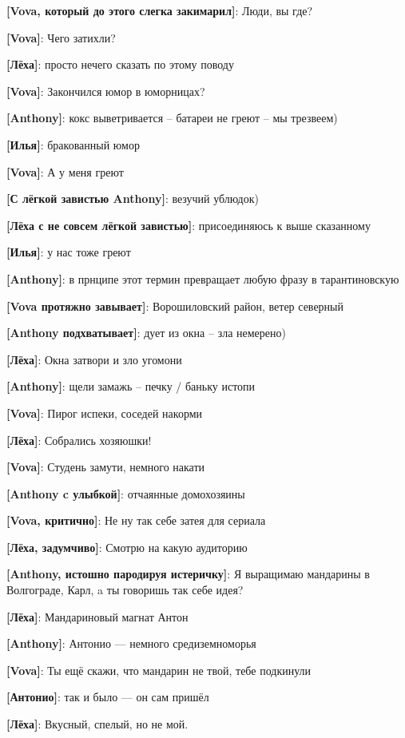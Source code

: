 \begin{flushleft}
\textbf{[Vova, который до этого слегка закимарил]}: Люди, вы где?

\textbf{[Vova]}: Чего затихли?

\textbf{[Лёха]}: просто нечего сказать по этому поводу

\textbf{[Vova]}: Закончился юмор в юморницах?

\textbf{[Anthony]}: кокс выветривается -- батареи не греют -- мы трезвеем)

\textbf{[Илья]}: бракованный юмор

\textbf{[Vova]}: А у меня греют

\textbf{[С лёгкой завистью Anthony]}: везучий ублюдок)

\textbf{[Лёха с не совсем лёгкой завистью]}: присоединяюсь к выше сказанному

\textbf{[Илья]}: у нас тоже греют

\textbf{[Anthony]}: в прнципе этот термин превращает любую фразу в тарантиновскую

\textbf{[Vova протяжно завывает]}: Ворошиловский район, ветер северный

\textbf{[Anthony подхватывает]}: дует из окна -- зла немерено)

\textbf{[Лёха]}: Окна затвори и зло угомони

\textbf{[Anthony]}: щели замажь -- печку / баньку истопи

\textbf{[Vova]}: Пирог испеки, соседей накорми

\textbf{[Лёха]}: Собрались хозяюшки!

\textbf{[Vova]}: Студень замути, немного накати

\textbf{[Anthony c улыбкой]}: отчаянные домохозяины

\textbf{[Vova, критично]}: Не ну так себе затея для сериала

\textbf{[Лёха, задумчиво]}: Смотрю на какую аудиторию

\textbf{[Anthony, истошно пародируя истеричку]}: Я выращимаю мандарины в Волгограде, Карл, a ты говоришь так себе идея?

\textbf{[Лёха]}: Мандариновый магнат Антон

\textbf{[Anthony]}: Антонио --- немного средиземноморья

\textbf{[Vova]}: Ты ещё скажи, что мандарин не твой, тебе подкинули

\textbf{[Антонио]}: так и было --- он сам пришёл

\textbf{[Лёха]}: Вкусный, спелый, но не мой.


\end{flushleft}

